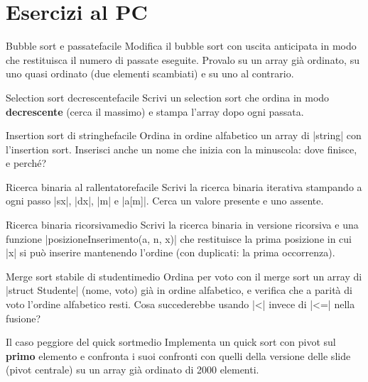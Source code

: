 \section{Esercizi al PC}

\begin{esercizio}{Bubble sort e passate}{facile}
Modifica il bubble sort con uscita anticipata in modo che restituisca il numero di
passate eseguite. Provalo su un array già ordinato, su uno quasi ordinato (due
elementi scambiati) e su uno al contrario.
\end{esercizio}

\begin{esercizio}{Selection sort decrescente}{facile}
Scrivi un selection sort che ordina in modo \textbf{decrescente} (cerca il massimo)
e stampa l'array dopo ogni passata.
\end{esercizio}

\begin{esercizio}{Insertion sort di stringhe}{facile}
Ordina in ordine alfabetico un array di \cc|string| con l'insertion sort. Inserisci
anche un nome che inizia con la minuscola: dove finisce, e perché?
\end{esercizio}

\begin{esercizio}{Ricerca binaria al rallentatore}{facile}
Scrivi la ricerca binaria iterativa stampando a ogni passo \cc|sx|, \cc|dx|, \cc|m| e
\cc|a[m]|. Cerca un valore presente e uno assente.
\end{esercizio}

\begin{esercizio}{Ricerca binaria ricorsiva}{medio}
Scrivi la ricerca binaria in versione ricorsiva e una funzione
\cc|posizioneInserimento(a, n, x)| che restituisce la prima posizione in cui
\cc|x| si può inserire mantenendo l'ordine (con duplicati: la prima occorrenza).
\end{esercizio}

\begin{esercizio}{Merge sort stabile di studenti}{medio}
Ordina per voto con il merge sort un array di \cc|struct Studente| (nome, voto) già
in ordine alfabetico, e verifica che a parità di voto l'ordine alfabetico resti.
Cosa succederebbe usando \cc|<| invece di \cc|<=| nella fusione?
\end{esercizio}

\begin{esercizio}{Il caso peggiore del quick sort}{medio}
Implementa un quick sort con pivot sul \textbf{primo} elemento e confronta i suoi
confronti con quelli della versione delle slide (pivot centrale) su un array già
ordinato di 2000 elementi.
\end{esercizio}

